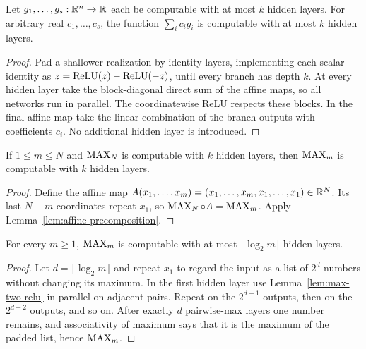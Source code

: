 \begin{lemma}
  \label{lem:parallel-linear-combination}
  Let $g_1,\ldots,g_s:\mathbb{R}^n\to\mathbb{R}$ each be computable with at most $k$ hidden
  layers.  For arbitrary real $c_1,\ldots,c_s$, the function
  $\sum_i c_i g_i$ is computable with at most $k$ hidden layers.
\end{lemma}
\begin{proof}
  Pad a shallower realization by identity layers, implementing each scalar
  identity as $z=\operatorname{ReLU}(z)-\operatorname{ReLU}(-z)$, until every branch has depth $k$.
  At every hidden layer take the block-diagonal direct sum of the affine maps,
  so all networks run in parallel.  The coordinatewise ReLU respects these
  blocks.  In the final affine map take the linear combination of the branch
  outputs with coefficients $c_i$.  No additional hidden layer is introduced.
\end{proof}

\begin{lemma}
  \label{lem:max-arity-restriction}
  If $1\leq m\leq N$ and $\operatorname{MAX}_N$ is computable with $k$ hidden layers, then
  $\operatorname{MAX}_m$ is computable with $k$ hidden layers.
\end{lemma}
\begin{proof}
  Define the affine map
  $A(x_1,\ldots,x_m)=(x_1,\ldots,x_m,x_1,\ldots,x_1)\in\mathbb{R}^N$.
  Its last $N-m$ coordinates repeat $x_1$, so
  $\operatorname{MAX}_N\circ A=\operatorname{MAX}_m$.  Apply Lemma~\ref{lem:affine-precomposition}.
\end{proof}

\begin{proposition}
  \label{prop:binary-tree-max-bound}
  For every $m\geq1$, $\operatorname{MAX}_m$ is computable with at most
  $\lceil\log_2m\rceil$ hidden layers.
\end{proposition}
\begin{proof}
  Let $d=\lceil\log_2m\rceil$ and repeat $x_1$ to regard the input as a list of
  $2^d$ numbers without changing its maximum.  In the first hidden layer use
  Lemma~\ref{lem:max-two-relu} in parallel on adjacent pairs.  Repeat on the
  $2^{d-1}$ outputs, then on the $2^{d-2}$ outputs, and so on.  After exactly
  $d$ pairwise-max layers one number remains, and associativity of maximum says
  that it is the maximum of the padded list, hence $\operatorname{MAX}_m$.
\end{proof}

